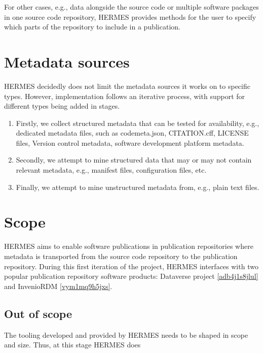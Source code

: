 \documentclass{article}
\begin{document}
For other cases, e.g., data alongside the source code or multiple software packages in one source code repository, HERMES provides methods for the user to specify which parts of the repository to include in a publication.



\section{Metadata sources}\label{s43q35fgxc42}
HERMES decidedly does not limit the metadata sources it works on to specific types. However, implementation follows an iterative process, with support for different types being added in stages.

\begin{enumerate}  
\item Firstly, we collect structured metadata that can be tested for availability, e.g., dedicated metadata files, such as codemeta.json, CITATION.cff, LICENSE files, Version control metadata, software development platform metadata.

\item Secondly, we attempt to mine structured data that may or may not contain relevant metadata, e.g., manifest files, configuration files, etc.

\item Finally, we attempt to mine unstructured metadata from, e.g., plain text files.


\end{enumerate}

\section{Scope}\label{g3qi39vk1lgb}
HERMES aims to enable software publications in publication repositories where metadata is transported from the source code repository to the publication repository. During this first iteration of the project, HERMES interfaces with two popular publication repository software products: Dataverse project \ref{adb4j1s8jlul} and InvenioRDM \ref{vym1mq9h5jxs}.



\subsection{Out of scope}\label{ak94twwc5mfr}
The tooling developed and provided by HERMES needs to be shaped in scope and size. Thus, at this stage HERMES does
\end{document}
